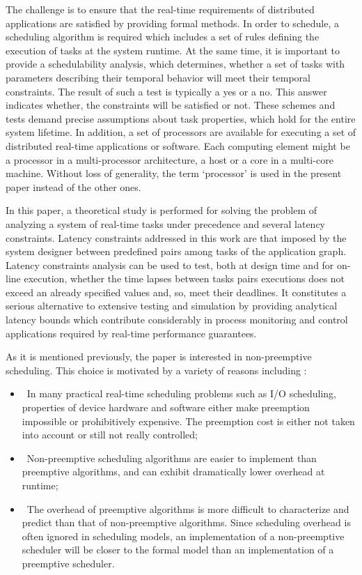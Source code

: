 \documentclass{ijcaArticle}
\begin{document}
The challenge is to ensure that the real-time requirements of distributed applications are satisfied by providing formal methods. In order to schedule, a scheduling
algorithm is required which includes a set of rules defining the execution of tasks at the system runtime. At the same time, it is important to provide a schedulability analysis, which determines, whether a
set of tasks with parameters describing their temporal behavior will meet their temporal constraints. The result of such a test is typically a yes or a no. This answer indicates whether,
the constraints will be satisfied or not. These schemes and tests demand precise assumptions about task properties, which hold for the entire system lifetime.  In addition,  a set of processors are available for executing a set of distributed real-time applications or software. Each computing element might be a processor in a multi-processor architecture, a host or a core in a multi-core machine. Without loss of generality, the term  \lq{}processor\rq{} is used in the present paper instead of the other ones.

In this paper, a theoretical study is performed for solving the problem of analyzing a system of real-time tasks under precedence and several latency constraints. Latency constraints
addressed in this work are that imposed by the system designer between predefined pairs among tasks of the application graph.   Latency constraints analysis can be used to test, both at design time and for on-line execution, whether the time lapses between tasks pairs executions does not exceed an already specified values and, so,  meet their deadlines. It constitutes a serious alternative to extensive testing and simulation by providing analytical latency bounds which contribute considerably in process monitoring and control applications required by real-time performance guarantees.   




As it is mentioned previously, the paper is interested in non-preemptive scheduling. This choice is motivated by a variety of reasons including \cite{jeffaynonpreemptive}:

\begin{itemize}
\item \ In many practical real-time scheduling problems such as I/O scheduling,
properties of device hardware and software either make preemption impossible or
prohibitively expensive. The preemption cost is either not taken into account or
still not really controlled;

\item \ Non-preemptive scheduling algorithms are easier to implement than preemptive
algorithms, and can exhibit dramatically lower overhead at runtime;

\item \ The overhead of preemptive algorithms is more difficult to characterize and
 predict than that of non-preemptive algorithms. Since scheduling overhead is
 often ignored in scheduling models, an implementation of a
 non-preemptive scheduler will be closer to the formal model than an
 implementation of a preemptive scheduler.
\end{itemize}
\end{document}
